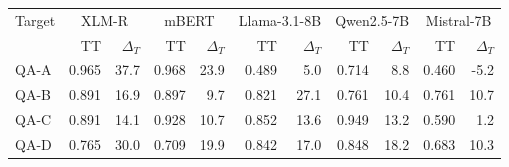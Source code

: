 \begin{tabular}{lrrrrrrrrrr}
\toprule
Target & \multicolumn{2}{c}{XLM-R} & \multicolumn{2}{c}{mBERT} & \multicolumn{2}{c}{Llama-3.1-8B} & \multicolumn{2}{c}{Qwen2.5-7B} & \multicolumn{2}{c}{Mistral-7B} \\
 & TT & $\Delta_T$ & TT & $\Delta_T$ & TT & $\Delta_T$ & TT & $\Delta_T$ & TT & $\Delta_T$ \\
\midrule
QA-A & 0.965 & 37.7 & 0.968 & 23.9 & 0.489 & 5.0 & 0.714 & 8.8 & 0.460 & -5.2 \\
QA-B & 0.891 & 16.9 & 0.897 & 9.7 & 0.821 & 27.1 & 0.761 & 10.4 & 0.761 & 10.7 \\
QA-C & 0.891 & 14.1 & 0.928 & 10.7 & 0.852 & 13.6 & 0.949 & 13.2 & 0.590 & 1.2 \\
QA-D & 0.765 & 30.0 & 0.709 & 19.9 & 0.842 & 17.0 & 0.848 & 18.2 & 0.683 & 10.3 \\
\bottomrule
\end{tabular}
